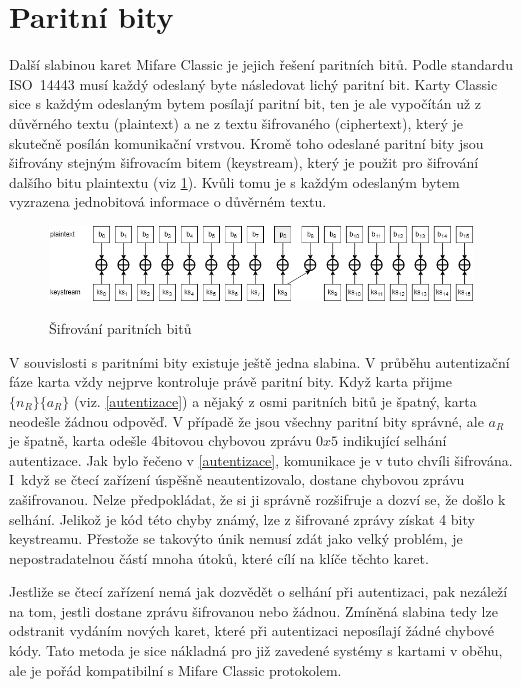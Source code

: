 \section{Paritní bity}
\label{paritni_bity}
Další slabinou karet Mifare Classic je jejich řešení paritních bitů. Podle standardu ISO~14443 musí každý odeslaný byte následovat lichý paritní bit. Karty Classic sice s každým odeslaným bytem posílají paritní bit, ten je ale vypočítán už z důvěrného textu (plaintext) a ne z textu šifrovaného (ciphertext), který je skutečně posílán komunikační vrstvou. Kromě toho odeslané paritní bity jsou šifrovány stejným šifrovacím bitem (keystream), který je použit pro šifrování dalšího bitu plaintextu (viz \ref{parityDiagram})\cite{Cryptanalisis}.
Kvůli tomu je s každým odeslaným bytem vyzrazena jednobitová informace o důvěrném textu\cite{Dismantling_Mifare_Classic}. 
\begin{figure}[ht]\centering
  \centering
  \includegraphics[width=\linewidth]{obrazky-figures/parityBits.png}\\[1pt]  
  \caption{Šifrování paritních bitů \cite{Cryptanalisis}}   
  \label{parityDiagram}
\end{figure}
\par
V souvislosti s paritními bity existuje ještě jedna slabina. V průběhu autentizační fáze karta vždy nejprve kontroluje právě paritní bity. Když karta přijme $\{n_R\}\{a_R\}$ (viz. \ref{autentizace}) a nějaký z osmi paritních bitů je špatný, karta neodešle žádnou odpověď. V případě že jsou všechny paritní bity správné, ale $a_R$ je špatně, karta odešle 4bitovou chybovou zprávu $0x5$ indikující selhání autentizace. Jak bylo řečeno v \ref{autentizace}, komunikace je v tuto chvíli šifrována. I~když se čtecí zařízení úspěšně neautentizovalo, dostane chybovou zprávu zašifrovanou. Nelze předpokládat, že si ji správně rozšifruje a dozví se, že došlo k selhání.
Jelikož je kód této chyby známý, lze z šifrované zprávy získat 4 bity keystreamu. Přestože se takovýto únik nemusí zdát jako velký problém, je nepostradatelnou částí mnoha útoků, které cílí na klíče těchto karet.
\par
Jestliže se čtecí zařízení nemá jak dozvědět o selhání při autentizaci, pak nezáleží na tom, jestli dostane zprávu šifrovanou nebo žádnou. Zmíněná slabina tedy lze odstranit vydáním nových karet, které při autentizaci neposílají žádné chybové kódy. Tato metoda je sice nákladná pro již zavedené systémy s kartami v oběhu, ale je pořád kompatibilní s Mifare Classic protokolem\cite{Cryptanalisis}. 

